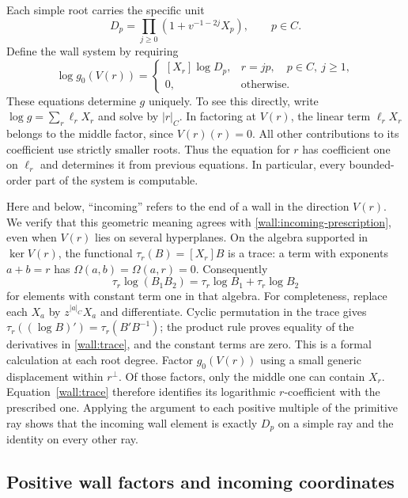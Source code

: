 Each simple root carries the specific unit
\begin{equation}
 D_p=\prod_{j\ge0}(1+v^{-1-2j}X_p),\qquad p\in C.
 \label{wall:initial-unit}
\end{equation}
Define the wall system by requiring
\begin{equation}
 [X_r]\log g_0(V(r))=
 \begin{cases}
 [X_r]\log D_p,&r=jp,\quad p\in C,\ j\ge1,\\
 0,&\text{otherwise}.
 \end{cases}
 \label{wall:incoming-prescription}
\end{equation}
These equations determine $g$ uniquely.  To see this directly, write
$\log g=\sum_r\ell_rX_r$ and solve by $|r|_C$.  In factoring at
$V(r)$, the linear term $\ell_rX_r$ belongs to the middle factor,
since $V(r)(r)=0$.  All other contributions to its coefficient use
strictly smaller roots.  Thus the equation for $r$ has coefficient
one on $\ell_r$ and determines it from previous equations.  In
particular, every bounded-order part of the system is computable.

Here and below, ``incoming'' refers to the end of a wall in the
direction $V(r)$.  We verify that this geometric meaning agrees with
\eqref{wall:incoming-prescription}, even when $V(r)$ lies on several
hyperplanes.  On the algebra supported in $\ker V(r)$, the functional
$\tau_r(B)=[X_r]B$ is a trace: a term with exponents $a+b=r$ has
$\Omega(a,b)=\Omega(a,r)=0$.  Consequently
\begin{equation}
 \tau_r\log(B_1B_2)=\tau_r\log B_1+\tau_r\log B_2
 \label{wall:trace}
\end{equation}
for elements with constant term one in that algebra.  For completeness,
replace each $X_a$ by $z^{|a|_C}X_a$ and differentiate.  Cyclic
permutation in the trace gives
$\tau_r((\log B)')=\tau_r(B'B^{-1})$; the product rule proves equality
of the derivatives in \eqref{wall:trace}, and the constant terms are
zero.  This is a formal calculation at each root degree.
Factor $g_0(V(r))$ using a small generic displacement within
$r^\perp$.  Of those factors, only the middle one can contain $X_r$.
Equation~\eqref{wall:trace} therefore identifies its logarithmic
$r$-coefficient with the prescribed one.  Applying the argument to
each positive multiple of the primitive ray shows that the incoming
wall element is exactly $D_p$ on a simple ray and the identity on
every other ray.

\subsection{Positive wall factors and incoming coordinates}

